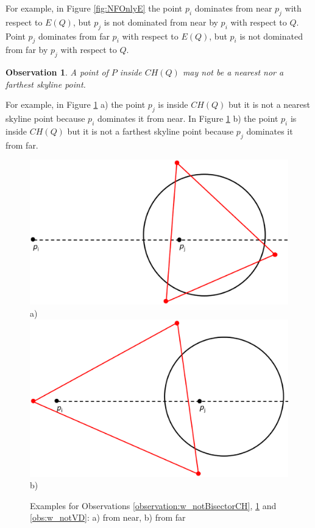 \documentclass[11pt,onecolumn]{elsart3p}
\newtheorem{observation}{Observation}
\begin{document}
        For example, in Figure \ref{fig:NFOnlyE} the point $p_i$ dominates from near $p_j$ with respect to $E(Q)$, but $p_j$ is not dominated from near by $p_i$ with respect to $Q$. Point $p_j$ dominates from far $p_i$ with respect to $E(Q)$, but $p_i$ is not dominated from far by $p_j$ with respect to $Q$.

        \vspace{1em}
        \begin{observation} A point of $P$ inside $CH(Q)$ may not be a nearest nor a farthest skyline point.
           \label{obs:w_not_insideCH}
        \end{observation}

        For example, in Figure \ref{fig:NF_FIntBisectorCH} a) the point $p_j$  is inside $CH(Q)$ but it is not a nearest skyline point because $p_i$ dominates it from near. In Figure \ref{fig:NF_FIntBisectorCH} b) the point $p_i$  is inside $CH(Q)$ but it is not a farthest skyline point because $p_j$ dominates it from far.
        \vspace{1em}

         \begin{figure}[h]
          \begin{center}
             \includegraphics[width=0.4\linewidth]{img/NFIntBisectorCH.eps} a)
             \includegraphics[width=0.4\linewidth]{img/FFIntBisectorCH.eps} b)

             \caption{Examples for Observations \ref{observation:w_notBisectorCH}, \ref{obs:w_not_insideCH} and \ref{obs:w_notVD}: a) from near, b) from far}

             \label{fig:NF_FIntBisectorCH}
            \end{center}
       \end{figure}
\end{document}
